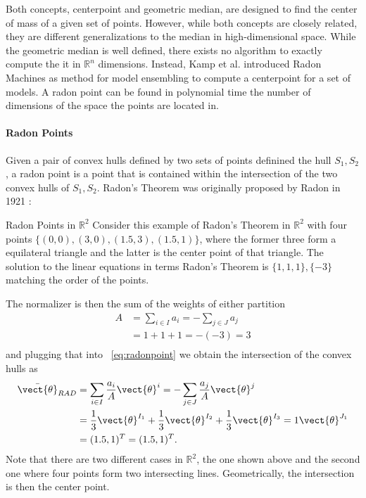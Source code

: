 Both concepts, centerpoint and geometric median, are designed to find the center of mass of a given set of points.
However, while both concepts are closely related, they are different generalizations to the median in high-dimensional space.
While the geometric median is well defined, there exists no algorithm to exactly compute the it in $\mathbb{R}^n$ dimensions.
Instead, Kamp et al. \cite{kamp2017effective} introduced Radon Machines as method for model ensembling to compute a centerpoint for a set of models.
A radon point can be found in polynomial time \wrt the number of dimensions of the space the points are located in.
\paragraph*{Radon Points}
Given a pair of convex hulls defined by two sets of points definined the hull $S_1, S_2$, a radon point is a point that is contained within the intersection of the two convex hulls of $S_1, S_2$. 
Radon's Theorem was originally proposed by Radon in 1921 \cite{radon1921mengen}:

\begin{example}{Radon Points in $\mathbb{R}^2$}
    Consider this example of Radon's Theorem in $\mathbb{R}^2$ with four points $\{(0,0), (3,0), (1.5, 3), (1.5,1)\}$, where the former three form a equilateral triangle and the latter is the center point of that triangle.
    The solution to the linear equations in terms Radon's Theorem is $\{1,1,1\},\{-3\}$ matching the order of the points.
    
     
    The normalizer is then the sum of the weights of either partition
    \begin{equation}
        \begin{split}
            A &= \sum_{i\in I} a_i = - \sum_{j \in J} a_j \\
            &= 1 + 1 + 1 = -(-3) = 3 \\
        \end{split}
    \end{equation}
    and plugging that into \eq~\ref{eq:radonpoint} we obtain the intersection of the convex hulls as
    \begin{equation}
        \begin{split}
            \bar{\vect{\theta}}_{RAD} &= \sum_{i\in I} \frac{a_i}{A} \vect{\theta}^i = - \sum_{j \in J} \frac{a_j}{A} \vect{\theta}^j \\
            &= \frac{1}{3} \vect{\theta}^{I_1} + \frac{1}{3} \vect{\theta}^{I_2} + \frac{1}{3} \vect{\theta}^{I_3} = 1 \vect{\theta}^{J_1} \\
            & =  (1.5, 1)^T = (1.5, 1)^T.
        \end{split}
    \end{equation}
    Note that there are two different cases in $\mathbb{R}^2$, the one shown above and the second one where four points form two intersecting lines. Geometrically, the intersection is then the center point.

\end{example}
   


